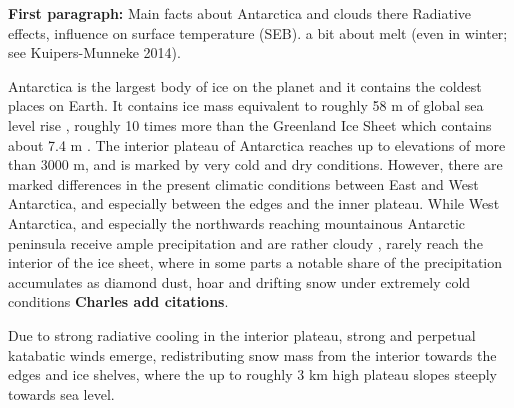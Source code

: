 \documentclass[12pt]{article}
\begin{document}
\textbf{First paragraph:} Main facts about Antarctica and clouds there
Radiative effects, influence on surface temperature (SEB). a bit about melt (even in winter; see Kuipers-Munneke 2014).

Antarctica is the largest body of ice on the planet and it contains the coldest places on Earth.  It contains ice mass equivalent to roughly 58 m of global sea level rise \cite{Fretwell2013}, roughly 10 times more than the Greenland Ice Sheet which contains about 7.4 m \cite{Morlighem2017}. The interior plateau of Antarctica reaches up to elevations of more than 3000 m, and is marked by very cold and dry conditions. However, there are marked differences in the present climatic conditions between East and West Antarctica, and especially between the edges and the inner plateau. While West Antarctica, and especially the northwards reaching mountainous Antarctic peninsula receive ample precipitation and are rather cloudy \cite{Gilbert2020}, rarely reach the interior of the ice sheet, where in some parts a notable share of the precipitation accumulates as diamond dust, hoar and drifting snow under extremely cold conditions \cite{Ricaud2017} \textbf{Charles add citations}.

Due to strong radiative cooling in the interior plateau, strong and perpetual katabatic winds emerge, redistributing snow mass from the interior towards the edges and ice shelves, where the up to roughly 3 km high plateau slopes steeply towards sea level.

\end{document}
